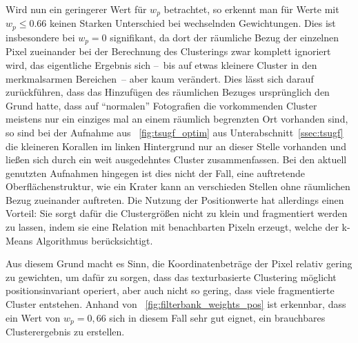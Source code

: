 Wird nun ein geringerer Wert für $w_p$ betrachtet, so erkennt man für Werte mit $w_p\leq0.66$ keinen Starken Unterschied bei wechselnden Gewichtungen. Dies ist insbesondere bei $w_p=0$ signifikant, da dort der räumliche Bezug der einzelnen Pixel zueinander bei der Berechnung des Clusterings zwar komplett ignoriert wird, das eigentliche Ergebnis sich --~bis auf etwas kleinere Cluster in den merkmalsarmen Bereichen~-- aber kaum verändert. Dies lässt sich darauf zurückführen, dass das Hinzufügen des räumlichen Bezuges ursprünglich den Grund hatte, dass auf \enquote{normalen} Fotografien die vorkommenden Cluster meistens nur ein einziges mal an einem räumlich begrenzten Ort vorhanden sind, so sind \zB bei der Aufnahme aus \figurename~\ref{fig:tsugf_optim} aus Unterabschnitt~\ref{ssec:tsugf} die kleineren Korallen im linken Hintergrund nur an dieser Stelle vorhanden und ließen sich durch ein weit ausgedehntes Cluster zusammenfassen. Bei den aktuell genutzten Aufnahmen hingegen ist dies nicht der Fall, eine auftretende Oberflächenstruktur, wie \zB ein Krater kann an verschieden Stellen ohne räumlichen Bezug zueinander auftreten.
Die Nutzung der Positionwerte hat allerdings einen Vorteil: Sie sorgt dafür die Clustergrößen nicht zu klein und fragmentiert werden zu lassen, indem sie eine Relation mit benachbarten Pixeln erzeugt, welche der k-Means Algorithmus berücksichtigt.

Aus diesem Grund macht es Sinn, die Koordinatenbeträge der Pixel relativ gering zu gewichten, um dafür zu sorgen, dass das texturbasierte Clustering möglicht positionsinvariant operiert, aber auch nicht so gering, dass viele fragmentierte Cluster entstehen. Anhand von \figurename~\ref{fig:filterbank_weights_pos} ist erkennbar, dass ein Wert von  $w_p=0,66$ sich in diesem Fall sehr gut eignet, ein brauchbares Clusterergebnis zu erstellen.

